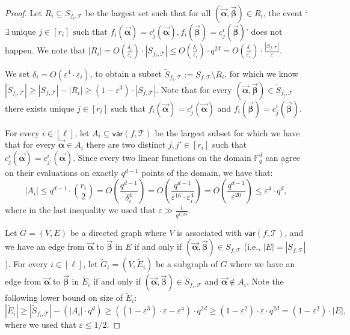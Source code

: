 \documentclass[11pt]{article}
\newcommand{\F}{\mathbb{F}}
\renewcommand{\ge}{ \geqslant}
\renewcommand{\le}{ \leqslant}
\renewcommand{\epsilon}{\varepsilon}
\newcommand{\alphab}{\vec{\bm{\alpha}}}
\newcommand{\betab}{\vec{\bm{\beta}}}
\newcommand{\var}{\mathsf{var}}
\renewcommand{\tilde}{\widetilde}
\begin{document}
\begin{proof}
	Let $R_i\subseteq S_{f_i,\mathcal{T}}$ be the largest set such that for all $(\alphab, \betab)\in R_i$, the event `$\exists\ \text{unique } j\in[r_i] \text{ such that }f_i(\alphab)=c_j^i(\alphab),
	f_i(\betab)=c_j^i(\betab)$' does not happen. We note that $|R_i|=O\left(\frac{\delta_i}{\epsilon_i}\right)\cdot |S_{f_i,\mathcal{T}}|\le O\left(\frac{\delta_i}{\epsilon_i}\right)\cdot q^{2d}= O\left(\frac{\delta_i}{\epsilon_i}\right)\cdot \frac{|S_{f,\mathcal{T}}|}{\varepsilon}$. 
	
	We set $\delta_i=O(\varepsilon^{4}\cdot \varepsilon_i)$, to obtain a subset $\tilde{S}_{f_i,\mathcal{T}}:=  S_{f,\mathcal{T}}\setminus R_i$, for which we know $|\tilde{S}_{f_i,\mathcal{T}}|\ge |{S}_{f,\mathcal{T}}|-|R_i| \ge  (1-\varepsilon^{3})\cdot |{S}_{f,\mathcal{T}}|$. Note that  for every $(\alphab, \betab) \in \tilde{S}_{f_i,\mathcal{T}}$ there exists unique $j\in[r_i]$ such that  $f_i(\alphab)=c_j^i(\alphab)$ and $f_i(\betab)=c_j^i(\betab)$.
	
	
	For every $i\in [\ell]$, let $A_i\subseteq \var(f,\mathcal{T})$ be the largest subset for which we have that for every  $\alphab\in A_i$ there are two distinct $j,j'\in [r_i]$ such that $c_j^i(\alphab)=c_{j'}^i(\alphab)$. 
	Since every two linear functions on the domain $\F_q^d$ can agree on their evaluations on exactly $q^{d-1}$ points of the domain, we have that:
	$$
	|A_i|\le {q^{d-1}}\cdot \binom{r_i}{2}=O\left(\frac{q^{d-1}}{\delta_i^4}\right)= O\left(\frac{q^{d-1}}{\varepsilon^{16}\cdot \varepsilon_i^4}\right)= O\left(\frac{q^{d-1}}{\varepsilon^{20}}\right)\le \varepsilon^{4}\cdot q^d,
	$$
	where in the last inequality we used that $\varepsilon\gg\frac{1}{q^{1/24}}$. 
	
	
	
	
	
	Let $G = (V,E)$ be a directed graph where $V$ is associated with $\var(f,\mathcal{T})$, and we have an edge from $\alphab$ to $\betab$ in $E$ if and only if $(\alphab,\betab)\in S_{f,\mathcal{T}}$ (i.e., $|E|=|S_{f,\mathcal{T}}|$). For every $i\in [\ell]$, let $\tilde G_i = (V,\tilde E_i)$ be a subgraph of $G$ where we have an edge from $\alphab$ to $\betab$ in $\tilde E_i$ if and only if $(\alphab,\betab)\in \tilde{S}_{f_i,\mathcal{T}}$ and $\alphab\notin A_i$. Note the following lower bound on size of $\tilde E_i$: $$|\tilde E_i|\ge |\tilde S_{f_i,\mathcal{T}}|-\left(|A_i|\cdot q^d\right)\ge  \left((1-\varepsilon^{3})\cdot \varepsilon-\varepsilon^{4}\right)\cdot q^{2d}\ge (1-\varepsilon^2)\cdot \varepsilon\cdot q^{2d}=(1-\varepsilon^2)\cdot |E|,$$ where we used that $\varepsilon\le 1/2$.
	

\end{proof}
\end{document}
